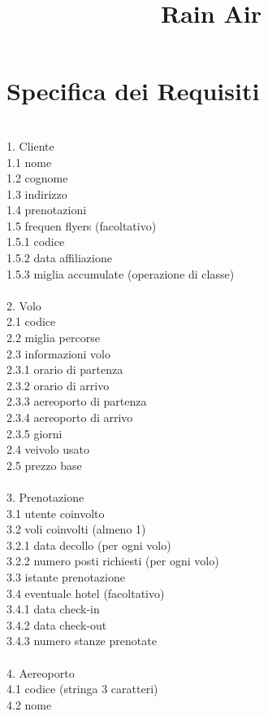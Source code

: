 \documentclass[12pt, letterpaper]{article}
\title{\textbf{Rain Air}}
\date{}
\newcommand{\acc}{\\\hphantom{}\\}
\newcommand{\id}{{\hphantom{ident}}}
\begin{document}
\maketitle\section{Specifica dei Requisiti}
\hphantom{a}\\
1. Cliente \\
\id 1.1 nome \\
\id 1.2 cognome\\
\id 1.3 indirizzo \\ 
\id 1.4 prenotazioni\\
\id 1.5 frequen flyers (facoltativo) \\ 
\id \id 1.5.1 codice \\ 
\id \id 1.5.2 data affiliazione\\
\id \id 1.5.3 miglia accumulate (operazione di classe)
\acc 
2. Volo \\ 
\id 2.1 codice \\ 
\id 2.2 miglia percorse \\ 
\id 2.3 informazioni volo \\
\id \id 2.3.1 orario di partenza \\
\id \id 2.3.2 orario di arrivo \\ 
\id \id 2.3.3 aereoporto di partenza \\
\id \id 2.3.4 aereoporto di arrivo \\ 
\id \id 2.3.5 giorni \\ 
\id 2.4 veivolo usato \\
\id 2.5 prezzo base \acc 
3. Prenotazione \\ 
\id 3.1 utente coinvolto \\ 
\id 3.2 voli coinvolti (almeno 1) \\ 
\id \id 3.2.1 data decollo (per ogni volo)\\ 
\id \id 3.2.2 numero posti richiesti (per ogni volo)\\ 
\id 3.3 istante prenotazione\\
\id 3.4 eventuale hotel (facoltativo) \\  
\id \id 3.4.1 data check-in \\
\id \id 3.4.2 data check-out\\ 
\id \id 3.4.3 numero stanze prenotate \acc 
4. Aereoporto \\ 
\id 4.1 codice (stringa 3 caratteri) \\ 
\id 4.2 nome \\
\end{document}
